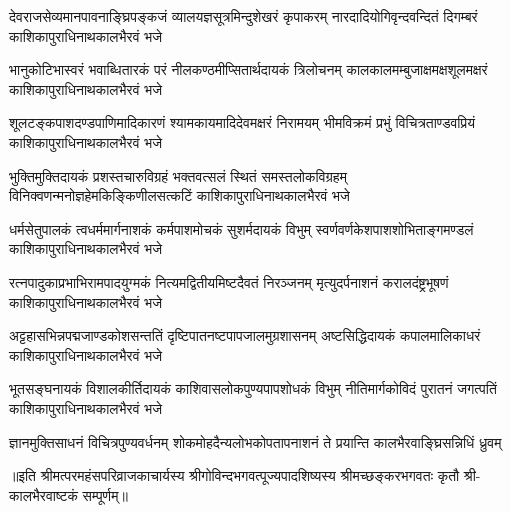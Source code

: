 
\fourlineindentedshloka
{देवराजसेव्यमानपावनाङ्घ्रिपङ्कजं}
{व्यालयज्ञसूत्रमिन्दुशेखरं कृपाकरम्}
{नारदादियोगिवृन्दवन्दितं दिगम्बरं}
{काशिकापुराधिनाथकालभैरवं भजे}%

\fourlineindentedshloka
{भानुकोटिभास्वरं भवाब्धितारकं परं}
{नीलकण्ठमीप्सितार्थदायकं त्रिलोचनम्}
{कालकालमम्बुजाक्षमक्षशूलमक्षरं}
{काशिकापुराधिनाथकालभैरवं भजे}%

\fourlineindentedshloka
{शूलटङ्कपाशदण्डपाणिमादिकारणं}
{श्यामकायमादिदेवमक्षरं निरामयम्}
{भीमविक्रमं प्रभुं विचित्रताण्डवप्रियं}
{काशिकापुराधिनाथकालभैरवं भजे}%

\fourlineindentedshloka
{भुक्तिमुक्तिदायकं प्रशस्तचारुविग्रहं}
{भक्तवत्सलं स्थितं समस्तलोकविग्रहम्}
{विनिक्वणन्मनोज्ञहेमकिङ्किणीलसत्कटिं}
{काशिकापुराधिनाथकालभैरवं भजे}%

\fourlineindentedshloka
{धर्मसेतुपालकं त्वधर्ममार्गनाशकं}
{कर्मपाशमोचकं सुशर्मदायकं विभुम्}
{स्वर्णवर्णकेशपाशशोभिताङ्गमण्डलं}
{काशिकापुराधिनाथकालभैरवं भजे}%

\fourlineindentedshloka
{रत्नपादुकाप्रभाभिरामपादयुग्मकं}
{नित्यमद्वितीयमिष्टदैवतं निरञ्जनम्}
{मृत्युदर्पनाशनं करालदंष्ट्रभूषणं}
{काशिकापुराधिनाथकालभैरवं भजे}%

\fourlineindentedshloka
{अट्टहासभिन्नपद्मजाण्डकोशसन्ततिं}
{दृष्टिपातनष्टपापजालमुग्रशासनम्}
{अष्टसिद्धिदायकं कपालमालिकाधरं}
{काशिकापुराधिनाथकालभैरवं भजे}%

\fourlineindentedshloka
{भूतसङ्घनायकं विशालकीर्तिदायकं}
{काशिवासलोकपुण्यपापशोधकं विभुम्}
{नीतिमार्गकोविदं पुरातनं जगत्पतिं}
{काशिकापुराधिनाथकालभैरवं भजे}%

{ज्ञानमुक्तिसाधनं विचित्रपुण्यवर्धनम्}
{शोकमोहदैन्यलोभकोपतापनाशनं}
{ते प्रयान्ति कालभैरवाङ्घ्रिसन्निधिं ध्रुवम्}

॥इति श्रीमत्परमहंसपरिव्राजकाचार्यस्य श्रीगोविन्दभगवत्पूज्यपादशिष्यस्य श्रीमच्छङ्करभगवतः कृतौ श्री-कालभैरवाष्टकं सम्पूर्णम्॥